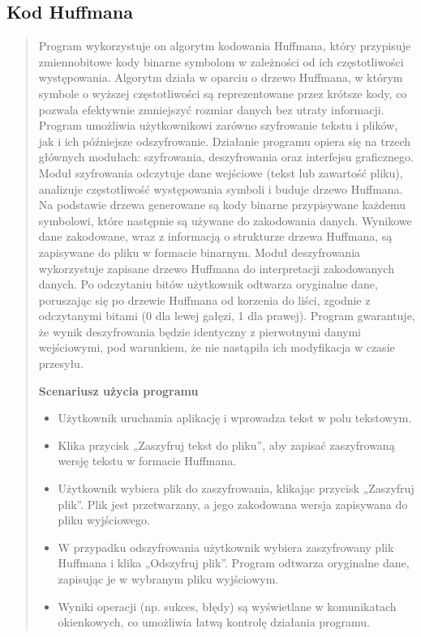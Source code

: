 \documentclass[12pt,a4paper]{article}
\begin{document}
\subsection{Kod Huffmana}
\begin{quotation} \noindent Program wykorzystuje on algorytm kodowania Huffmana, który przypisuje zmiennobitowe kody binarne symbolom w zależności od ich częstotliwości występowania. Algorytm działa w oparciu o drzewo Huffmana, w którym symbole o wyższej częstotliwości są reprezentowane przez krótsze kody, co pozwala efektywnie zmniejszyć rozmiar danych bez utraty informacji. Program umożliwia użytkownikowi zarówno szyfrowanie tekstu i plików, jak i ich późniejsze odszyfrowanie. Działanie programu opiera się na trzech głównych modułach: szyfrowania, deszyfrowania oraz interfejsu graficznego. Moduł szyfrowania odczytuje dane wejściowe (tekst lub zawartość pliku), analizuje częstotliwość występowania symboli i buduje drzewo Huffmana. Na podstawie drzewa generowane są kody binarne przypisywane każdemu symbolowi, które następnie są używane do zakodowania danych. Wynikowe dane zakodowane, wraz z informacją o strukturze drzewa Huffmana, są zapisywane do pliku w formacie binarnym. Moduł deszyfrowania wykorzystuje zapisane drzewo Huffmana do interpretacji zakodowanych danych. Po odczytaniu bitów użytkownik odtwarza oryginalne dane, poruszając się po drzewie Huffmana od korzenia do liści, zgodnie z odczytanymi bitami (0 dla lewej gałęzi, 1 dla prawej). Program gwarantuje, że wynik deszyfrowania będzie identyczny z pierwotnymi danymi wejściowymi, pod warunkiem, że nie nastąpiła ich modyfikacja w czasie przesyłu.\newline

\noindent\textbf{Scenariusz użycia programu}
\begin{itemize}
\item Użytkownik uruchamia aplikację i wprowadza tekst w polu tekstowym.
\item Klika przycisk „Zaszyfruj tekst do pliku”, aby zapisać zaszyfrowaną wersję tekstu w formacie Huffmana.
\item Użytkownik wybiera plik do zaszyfrowania, klikając przycisk „Zaszyfruj plik”. Plik jest przetwarzany, a jego zakodowana wersja zapisywana do pliku wyjściowego.
\item W przypadku odszyfrowania użytkownik wybiera zaszyfrowany plik Huffmana i klika „Odszyfruj plik”. Program odtwarza oryginalne dane, zapisując je w wybranym pliku wyjściowym.
\item Wyniki operacji (np. sukces, błędy) są wyświetlane w komunikatach okienkowych, co umożliwia łatwą kontrolę działania programu.
\end{itemize}
\end{quotation}
\end{document}
